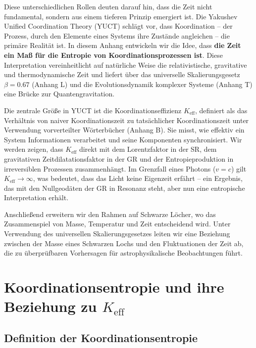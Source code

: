 \documentclass[12pt,a4paper]{article}
\newcommand{\Keff}{K_{\mathrm{eff}}}
\begin{document}
	Diese unterschiedlichen Rollen deuten darauf hin, dass die Zeit nicht fundamental, sondern aus einem tieferen Prinzip emergiert ist. Die Yakushev Unified Coordination Theory (YUCT) schlägt vor, dass Koordination – der Prozess, durch den Elemente eines Systems ihre Zustände angleichen – die primäre Realität ist. In diesem Anhang entwickeln wir die Idee, dass \textbf{die Zeit ein Maß für die Entropie von Koordinationsprozessen ist}. Diese Interpretation vereinheitlicht auf natürliche Weise die relativistische, gravitative und thermodynamische Zeit und liefert über das universelle Skalierungsgesetz \(\beta = 0.67\) (Anhang L) und die Evolutionsdynamik komplexer Systeme (Anhang T) eine Brücke zur Quantengravitation.
	
	Die zentrale Größe in YUCT ist die Koordinationseffizienz \(\Keff\), definiert als das Verhältnis von naiver Koordinationszeit zu tatsächlicher Koordinationszeit unter Verwendung vorverteilter Wörterbücher (Anhang B). Sie misst, wie effektiv ein System Informationen verarbeitet und seine Komponenten synchronisiert. Wir werden zeigen, dass \(\Keff\) direkt mit dem Lorentzfaktor in der SR, dem gravitativen Zeitdilatationsfaktor in der GR und der Entropieproduktion in irreversiblen Prozessen zusammenhängt. Im Grenzfall eines Photons (\(v=c\)) gilt \(\Keff \to \infty\), was bedeutet, dass das Licht keine Eigenzeit erfährt – ein Ergebnis, das mit den Nullgeodäten der GR in Resonanz steht, aber nun eine entropische Interpretation erhält.
	
	Anschließend erweitern wir den Rahmen auf Schwarze Löcher, wo das Zusammenspiel von Masse, Temperatur und Zeit entscheidend wird. Unter Verwendung des universellen Skalierungsgesetzes leiten wir eine Beziehung zwischen der Masse eines Schwarzen Lochs und den Fluktuationen der Zeit ab, die zu überprüfbaren Vorhersagen für astrophysikalische Beobachtungen führt.
	
	\section{Koordinationsentropie und ihre Beziehung zu \(\Keff\)}
	\label{sec:coord_entropy}
	
	\subsection{Definition der Koordinationsentropie}
	
\end{document}
